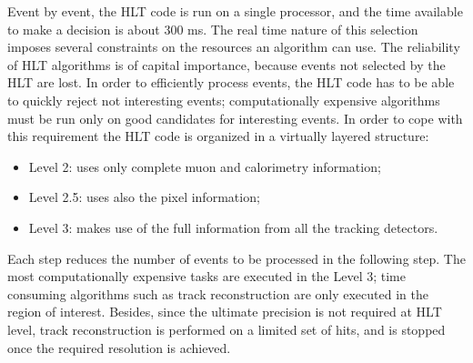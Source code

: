 Event by event, the HLT code is run on a single processor, and the time available to make a decision is about 300 ms. The real time nature of this selection imposes several constraints on the resources an algorithm can use. The reliability of HLT algorithms is of capital importance, because events not selected by the HLT are lost. In order to efficiently process events, the HLT code has to be able to quickly reject not interesting events; computationally expensive algorithms must be run only on good candidates for interesting events. In order to cope with this requirement the HLT code is organized
in a virtually layered structure:
\begin{itemize}
\item Level 2: uses only complete muon and calorimetry information;
\item Level 2.5: uses also the pixel information;
\item Level 3: makes use of the full information from all the tracking detectors.
\end{itemize}
Each step reduces the number of events to be processed in the following step. The most computationally expensive tasks are executed in the Level 3; time consuming algorithms such as track reconstruction are only executed in the region of interest. Besides, since the ultimate precision is not required at HLT level, track reconstruction is performed on a limited set of hits, and is stopped once the required resolution is achieved.








